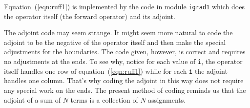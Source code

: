 Equation~(\ref{eqn:ruff1}) is implemented by the code
in module \texttt{igrad1}
which does the operator itself (the forward operator)
and its adjoint.

\par \noindent
The adjoint code may seem strange.
It might seem more natural to code the adjoint
to be the negative of the operator itself
and then make the special adjustments for the boundaries.
The code given, however, is correct and requires no adjustments
at the ends.
To see why, notice for each value of \texttt{i},
the operator itself handles one row of
equation~(\ref{eqn:ruff1})
while for each \texttt{i}
the adjoint handles one column.
That's why coding the adjoint in this way
does not require any special work on the ends.
The present method of coding reminds us that
the adjoint of a sum of $N$ terms is a collection of $N$ assignments.


\begin{comment}
\par
The Ratfor90 dialect of Fortran
allows us to write the inner code of
the \texttt{igrad1} module more simply and symmetrically
using the syntax of C, C++, and Java
where
expressions like {\tt a=a+b} can be written more tersely as {\tt a+=b}.
With this, the heart of module \texttt{igrad1} becomes
\begin{verbatim}
if( adj) {   xx(i+1) += yy(i)
             xx(i)   -= yy(i)
           }
else {       yy(i)   += xx(i+1)
             yy(i)   -= xx(i)
           }
\end{verbatim}
where we see that each component of the matrix is handled both by the
operator and the adjoint.  Think about the forward operator
``pulling'' a sum into {\tt yy(i)}, and think about the adjoint
operator ``pushing'' or ``spraying'' the impulse {\tt yy(i)} back into
{\tt xx()}.
\end{comment}



